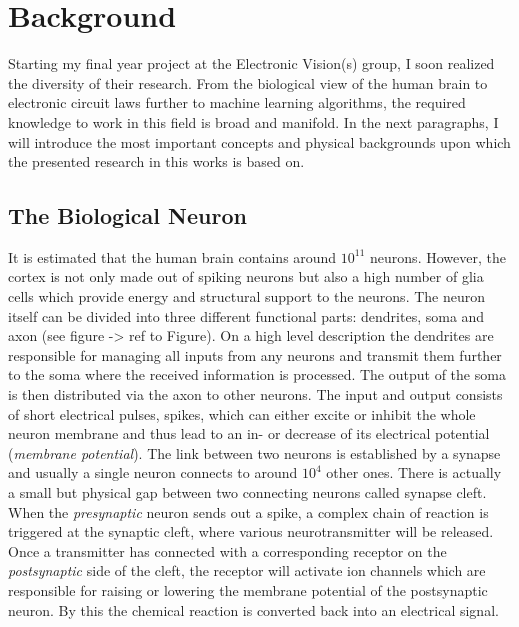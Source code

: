 \chapter{Background}
Starting my final year project at the Electronic Vision(s) group, I soon realized the diversity of their research. From the biological view of the human brain to electronic circuit laws further to machine learning algorithms, the required knowledge to work in this field is broad and manifold. In the next paragraphs, I will introduce the most important concepts and physical backgrounds upon which the presented research in this works is based on.

\section{The Biological Neuron}

It is estimated that the human brain contains around $10^11$ neurons. However, the cortex is not only made out of spiking neurons but also a high number of glia cells which provide energy and structural support to the neurons. The neuron itself can be divided into three different functional parts: dendrites, soma and axon (see figure -> ref to Figure). On a high level description the dendrites are responsible for managing all inputs from any neurons and transmit them further to the soma where the received information is processed. The output of the soma is then distributed via the axon to other neurons.  The input and output consists of short electrical pulses, spikes, which can either excite or inhibit the whole neuron membrane and thus lead to an in- or decrease of its electrical potential (\textit{membrane potential}). The link between two neurons is established by a synapse and usually a single neuron connects to around $10^4$ other ones. There is actually a small but physical gap between two connecting neurons called synapse cleft. When the \textit{presynaptic} neuron sends out a spike, a complex chain of reaction is triggered at the synaptic cleft, where various neurotransmitter will be released. Once a transmitter has connected with a corresponding receptor on the \textit{postsynaptic} side of the cleft, the receptor will activate ion channels which are responsible for raising or lowering the membrane potential of the postsynaptic neuron. By this the chemical reaction is converted back into an electrical signal.\\

